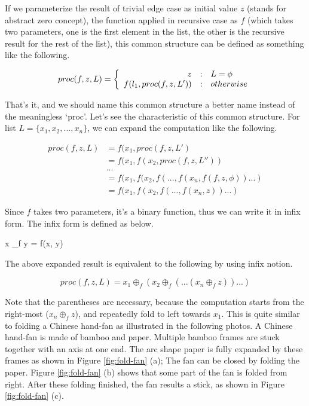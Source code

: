\documentclass[UTF8]{article}
\begin{document}
If we parameterize the result of trivial edge case as initial value $z$ (stands for abstract zero concept), the
function applied in recursive case as $f$ (which takes two parameters, one is the first element in the list,
the other is the recursive result for the rest of the list), this common structure can be defined as something
like the following.

\[
proc(f, z, L) = \left \{
  \begin{array}
  {r@{\quad:\quad}l}
  z & L = \phi \\
  f(l_1, proc(f, z, L')) & otherwise
  \end{array}
\right.
\]

That's it, and we should name this common structure a better name instead of the meaningless `proc'. Let's
see the characteristic of this common structure. For list $L = \{x_1, x_2, ..., x_n \}$, we can expand the
computation like the following.

\[
\begin{array}{rl}
proc(f, z, L) & = f(x_1, proc(f, z, L') \\
        & = f(x_1, f(x_2, proc(f, z, L'')) \\
        & ... \\
        & = f(x_1, f(x_2, f(..., f(x_n, f(f, z, \phi))...) \\
        & = f(x_1, f(x_2, f(..., f(x_n, z))...)
\end{array}
\]

Since $f$ takes two parameters, it's a binary function, thus we can write it in infix form. The infix
form is defined as below.

\be
x \oplus_f y = f(x, y)
\ee

The above expanded result is equivalent to the following by using infix notion.

\[
proc(f, z, L) = x_1 \oplus_f (x_2 \oplus_f (... (x_n \oplus_f z))...)
\]

Note that the parentheses are necessary, because the computation starts from the right-most ($x_n \oplus_f z$),
and repeatedly fold to left towards $x_1$. This is quite similar to folding a Chinese hand-fan as illustrated
in the following photos. A Chinese hand-fan is made of bamboo and paper. Multiple bamboo frames are stuck
together with an axis at one end. The arc shape paper is fully expanded by these frames as shown in Figure
\ref{fig:fold-fan} (a);
The fan can be closed by folding the paper. Figure \ref{fig:fold-fan} (b) shows that some part of the fan
is folded from right. After these folding finished, the fan results a stick, as shown in Figure \ref{fig:fold-fan} (c).
\end{document}
